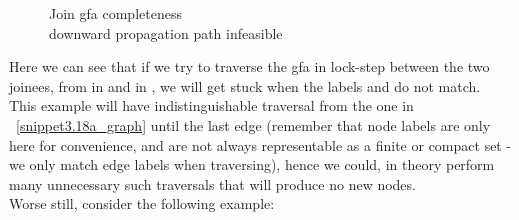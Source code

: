 \begin{figure}[H]

\caption{
Join gfa completeness\\
downward propagation path infeasible
}
\label{snippet3.19_graph}
\end{figure}
Here we can see that if we try to traverse the gfa in lock-step between the two joinees, 
from  in  and  in , we will get stuck when the labels  and  do not match.\\
This example will have indistinguishable traversal from the one in ~\ref{snippet3.18a_graph} until the last edge 
(remember that node labels are only here for convenience, and are not always representable as a finite or compact set - 
we only match edge labels when traversing), hence we could, in theory perform many unnecessary such traversals that will produce no new nodes.\\
Worse still, consider the following example:
